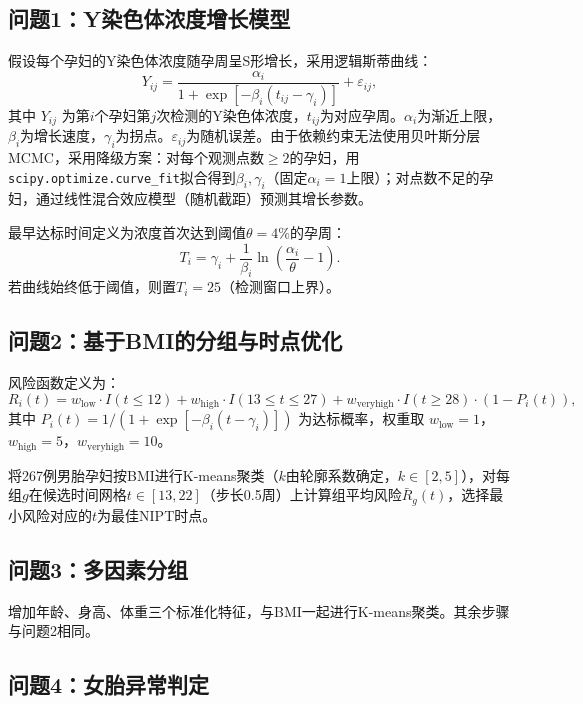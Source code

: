 \documentclass[12pt,a4paper]{article}
\begin{document}
\subsection{问题1：Y染色体浓度增长模型}

假设每个孕妇的Y染色体浓度随孕周呈S形增长，采用逻辑斯蒂曲线：
\begin{equation}\label{eq:logistic}
Y_{ij} = \frac{\alpha_i}{1+\exp\left[-\beta_i(t_{ij}-\gamma_i)\right]} + \varepsilon_{ij},
\end{equation}
其中 $Y_{ij}$ 为第$i$个孕妇第$j$次检测的Y染色体浓度，$t_{ij}$为对应孕周。$\alpha_i$为渐近上限，$\beta_i$为增长速度，$\gamma_i$为拐点。$\varepsilon_{ij}$为随机误差。由于依赖约束无法使用贝叶斯分层MCMC，采用降级方案：对每个观测点数$\geq2$的孕妇，用\texttt{scipy.optimize.curve\_fit}拟合得到$\beta_i,\gamma_i$（固定$\alpha_i=1$上限）；对点数不足的孕妇，通过线性混合效应模型（随机截距）预测其增长参数。

最早达标时间定义为浓度首次达到阈值$\theta=4\%$的孕周：
\begin{equation}\label{eq:T}
T_i = \gamma_i + \frac{1}{\beta_i}\ln\left(\frac{\alpha_i}{\theta}-1\right).
\end{equation}
若曲线始终低于阈值，则置$T_i=25$（检测窗口上界）。

\subsection{问题2：基于BMI的分组与时点优化}

风险函数定义为：
\begin{equation}\label{eq:risk}
R_i(t)= w_{\text{low}}\cdot I(t\leq12) + w_{\text{high}}\cdot I(13\leq t\leq27) + w_{\text{veryhigh}}\cdot I(t\geq28)\cdot(1-P_i(t)),
\end{equation}
其中 $P_i(t)=1/(1+\exp[-\beta_i(t-\gamma_i)])$ 为达标概率，权重取 $w_{\text{low}}=1$，$w_{\text{high}}=5$，$w_{\text{veryhigh}}=10$。

将267例男胎孕妇按BMI进行K-means聚类（$k$由轮廓系数确定，$k\in[2,5]$），对每组$g$在候选时间网格$t\in[13,22]$（步长0.5周）上计算组平均风险$\bar{R}_g(t)$，选择最小风险对应的$t$为最佳NIPT时点。

\subsection{问题3：多因素分组}

增加年龄、身高、体重三个标准化特征，与BMI一起进行K-means聚类。其余步骤与问题2相同。

\subsection{问题4：女胎异常判定}
\end{document}
